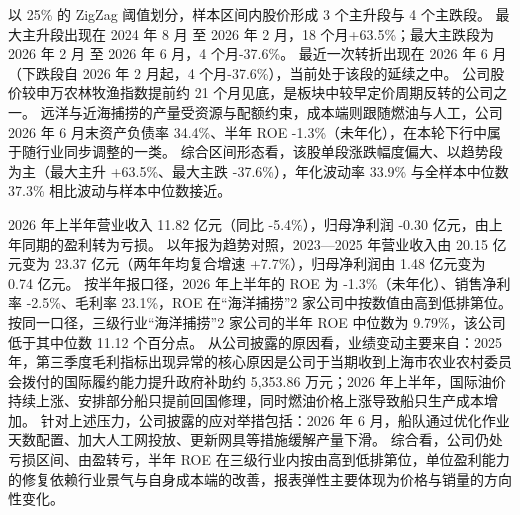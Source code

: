  以 25\% 的 ZigZag 阈值划分，样本区间内股价形成 3 个主升段与 4 个主跌段。 最大主升段出现在 2024 年 8 月 至 2026 年 2 月，18 个月+63.5\%；最大主跌段为 2026 年 2 月 至 2026 年 6 月，4 个月-37.6\%。 最近一次转折出现在 2026 年 6 月（下跌段自 2026 年 2 月起，4 个月-37.6\%），当前处于该段的延续之中。 公司股价较申万农林牧渔指数提前约 21 个月见底，是板块中较早定价周期反转的公司之一。 远洋与近海捕捞的产量受资源与配额约束，成本端则跟随燃油与人工，公司 2026 年 6 月末资产负债率 34.4\%、半年 ROE -1.3\%（未年化），在本轮下行中属于随行业同步调整的一类。 综合区间形态看，该股单段涨跌幅度偏大、以趋势段为主（最大主升 +63.5\%、最大主跌 -37.6\%），年化波动率 33.9\% 与全样本中位数 37.3\% 相比波动与样本中位数接近。

 2026 年上半年营业收入 11.82 亿元（同比 -5.4\%），归母净利润 -0.30 亿元，由上年同期的盈利转为亏损。 以年报为趋势对照，2023---2025 年营业收入由 20.15 亿元变为 23.37 亿元（两年年均复合增速 +7.7\%），归母净利润由 1.48 亿元变为 0.74 亿元。 按半年报口径，2026 年上半年的 ROE 为 -1.3\%（未年化）、销售净利率 -2.5\%、毛利率 23.1\%，ROE 在“海洋捕捞”2 家公司中按数值由高到低排第位。 按同一口径，三级行业“海洋捕捞”2 家公司的半年 ROE 中位数为 9.79\%，该公司低于其中位数 11.12 个百分点。 从公司披露的原因看，业绩变动主要来自：2025 年，第三季度毛利指标出现异常的核心原因是公司于当期收到上海市农业农村委员会拨付的国际履约能力提升政府补助约 5,353.86 万元；2026 年上半年，国际油价持续上涨、安排部分船只提前回国修理，同时燃油价格上涨导致船只生产成本增加。 针对上述压力，公司披露的应对举措包括：2026 年 6 月，船队通过优化作业天数配置、加大人工网投放、更新网具等措施缓解产量下滑。 综合看，公司仍处亏损区间、由盈转亏，半年 ROE 在三级行业内按由高到低排第位，单位盈利能力的修复依赖行业景气与自身成本端的改善，报表弹性主要体现为价格与销量的方向性变化。

